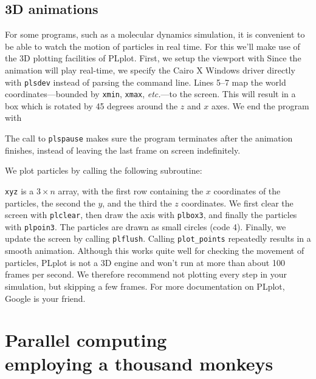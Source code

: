\documentclass[openany,oneside]{report}
\newcommand{\Chapter}[2]{\chapter[#1]{#1\\[1ex]\Large#2}}
\begin{document}
\section{3D animations}

For some programs, such as a molecular dynamics simulation, it is convenient to be able to watch the motion of particles in real time.
For this we'll make use of the 3D plotting facilities of PLplot.
First, we setup the viewport with
Since the animation will play real-time, we specify the Cairo X Windows driver directly with \texttt{plsdev} instead of parsing the command line.
Lines 5--7 map the world coordinates---bounded by \texttt{xmin}, \texttt{xmax}, \emph{etc.}---to the screen.
This will result in a box which is rotated by 45 degrees around the $z$ and $x$ axes.
We end the program with

The call to \texttt{plspause} makes sure the program terminates after the animation finishes, instead of leaving the last frame on screen indefinitely.

We plot particles by calling the following subroutine:

\texttt{xyz} is a $3\times n$ array, with the first row containing the $x$ coordinates of the particles, the second the $y$, and the third the $z$ coordinates.
We first clear the screen with \texttt{plclear}, then draw the axis with \texttt{plbox3}, and finally the particles with \texttt{plpoin3}.
The particles are drawn as small circles (code 4).
Finally, we update the screen by calling \texttt{plflush}.
Calling \texttt{plot\_points} repeatedly results in a smooth animation.
Although this works quite well for checking the movement of particles, PLplot is not a 3D engine and won't run at more than about 100 frames per second.
We therefore recommend not plotting every step in your simulation, but skipping a few frames.
For more documentation on PLplot, Google is your friend.

\Chapter{Parallel computing}{employing a thousand monkeys}
\label{chap:Parallel computing}
\end{document}
